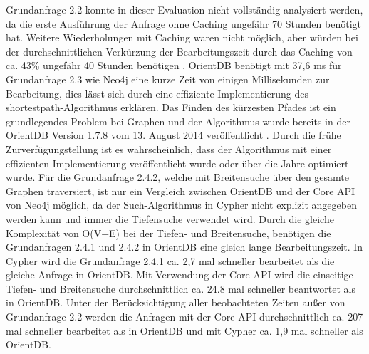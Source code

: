  Grundanfrage 2.2 konnte in dieser Evaluation nicht vollständig analysiert werden, da die erste Ausführung der Anfrage ohne Caching ungefähr 70 Stunden benötigt hat. Weitere Wiederholungen mit Caching waren nicht möglich, aber würden bei der durchschnittlichen Verkürzung der Bearbeitungszeit durch das Caching von ca. 43\%  ungefähr 40 Stunden benötigen . \newline
OrientDB benötigt mit 37,6 ms für Grundanfrage 2.3  wie Neo4j eine kurze Zeit von einigen Millisekunden zur Bearbeitung, dies lässt sich durch eine effiziente Implementierung des shortestpath-Algorithmus erklären. Das Finden des kürzesten Pfades ist ein grundlegendes Problem bei Graphen und der Algorithmus wurde bereits in der OrientDB Version 1.7.8 vom 13. August 2014 veröffentlicht \parencite{Old_OrientDB}. Durch die frühe Zurverfügungstellung ist es wahrscheinlich, dass der Algorithmus mit einer effizienten Implementierung veröffentlicht wurde oder über die Jahre optimiert wurde. \newline
Für die Grundanfrage 2.4.2, welche mit Breitensuche über den gesamte Graphen traversiert, ist nur ein Vergleich zwischen OrientDB und der Core API von Neo4j möglich, da der Such-Algorithmus in Cypher nicht explizit angegeben werden kann und immer die Tiefensuche verwendet wird. Durch die gleiche Komplexität von O(V+E) bei der Tiefen- und Breitensuche, benötigen die Grundanfragen 2.4.1 und 2.4.2 in OrientDB eine gleich lange Bearbeitungszeit. In Cypher wird die Grundanfrage 2.4.1 ca. 2,7 mal schneller bearbeitet als die gleiche Anfrage in OrientDB. Mit Verwendung der Core API wird die einseitige Tiefen- und Breitensuche durchschnittlich ca. 24.8 mal schneller beantwortet als in OrientDB. \newline
 Unter der Berücksichtigung aller beobachteten Zeiten außer von Grundanfrage 2.2 werden die Anfragen mit der Core API durchschnittlich ca. 207 mal schneller bearbeitet als in OrientDB und mit Cypher ca. 1,9 mal schneller als OrientDB. 
\FloatBarrier
